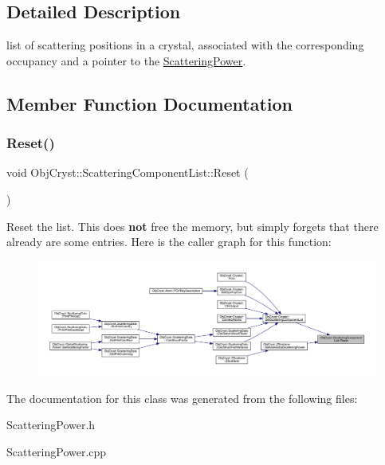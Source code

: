 \subsection{Detailed Description}
list of scattering positions in a crystal, associated with the corresponding occupancy and a pointer to the \mbox{\hyperlink{class_obj_cryst_1_1_scattering_power}{Scattering\+Power}}. 



\subsection{Member Function Documentation}
\mbox{\label{class_obj_cryst_1_1_scattering_component_list_a512dcd4870c53b3f98ad6e7b04be9801}} 
\subsubsection{\texorpdfstring{Reset()}{Reset()}}
{\footnotesize\ttfamily void Obj\+Cryst\+::\+Scattering\+Component\+List\+::\+Reset (\begin{DoxyParamCaption}{ }\end{DoxyParamCaption})}

Reset the list. This does {\bfseries{not}} free the memory, but simply forgets that there already are some entries. Here is the caller graph for this function\+:
\nopagebreak
\begin{figure}[H]
\begin{center}
\leavevmode
\includegraphics[width=350pt]{class_obj_cryst_1_1_scattering_component_list_a512dcd4870c53b3f98ad6e7b04be9801_icgraph}
\end{center}
\end{figure}


The documentation for this class was generated from the following files\+:\begin{DoxyCompactItemize}
\item 
Scattering\+Power.\+h\item 
Scattering\+Power.\+cpp\end{DoxyCompactItemize}
